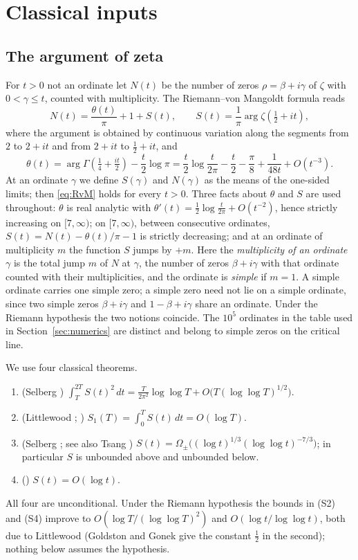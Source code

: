 \documentclass[11pt]{article}
\begin{document}
\section{Classical inputs}\label{sec:inputs}

\subsection{The argument of zeta}
For $t>0$ not an ordinate let $N(t)$ be the number of zeros $\rho=\beta+i\gamma$ of $\zeta$ with $0<\gamma\le t$, counted with multiplicity. The Riemann--von Mangoldt formula reads
\begin{equation}\label{eq:RvM}
N(t)=\frac{\theta(t)}{\pi}+1+S(t),\qquad S(t)=\frac1\pi\arg\zeta(\tfrac12+it),
\end{equation}
where the argument is obtained by continuous variation along the segments from $2$ to $2+it$ and from $2+it$ to $\frac12+it$, and
\[
\theta(t)=\arg\Gamma(\tfrac14+\tfrac{it}{2})-\frac t2\log\pi=\frac t2\log\frac{t}{2\pi}-\frac t2-\frac\pi8+\frac1{48t}+O(t^{-3}).
\]
At an ordinate $\gamma$ we define $S(\gamma)$ and $N(\gamma)$ as the means of the one-sided limits; then \eqref{eq:RvM} holds for every $t>0$. Three facts about $\theta$ and $S$ are used throughout: $\theta$ is real analytic with $\theta'(t)=\frac12\log\frac{t}{2\pi}+O(t^{-2})$, hence strictly increasing on $[7,\infty)$; on $[7,\infty)$, between consecutive ordinates, $S(t)=N(t)-\theta(t)/\pi-1$ is strictly decreasing; and at an ordinate of multiplicity $m$ the function $S$ jumps by $+m$. Here the \emph{multiplicity of an ordinate} $\gamma$ is the total jump $m$ of $N$ at $\gamma$, the number of zeros $\beta+i\gamma$ with that ordinate counted with their multiplicities, and the ordinate is \emph{simple} if $m=1$. A simple ordinate carries one simple zero; a simple zero need not lie on a simple ordinate, since two simple zeros $\beta+i\gamma$ and $1-\beta+i\gamma$ share an ordinate. Under the Riemann hypothesis the two notions coincide. The $10^5$ ordinates in the table used in Section~\ref{sec:numerics} are distinct and belong to simple zeros on the critical line.

We use four classical theorems.
\begin{enumerate}
\item[(S1)] (Selberg \cite{Selberg46}) $\displaystyle\int_T^{2T}S(t)^2\,dt=\frac{T}{2\pi^2}\log\log T+O\bigl(T(\log\log T)^{1/2}\bigr)$.
\item[(S2)] (Littlewood \cite{Littlewood24}; \cite[Theorem 9.9(A)]{Titchmarsh}) $S_1(T)=\int_0^T S(t)\,dt=O(\log T)$.
\item[(S3)] (Selberg \cite{Selberg46}; see also Tsang \cite{Tsang86}) $S(t)=\Omega_\pm\bigl((\log t)^{1/3}(\log\log t)^{-7/3}\bigr)$; in particular $S$ is unbounded above and unbounded below.
\item[(S4)] (\cite[Theorem 9.4]{Titchmarsh}) $S(t)=O(\log t)$.
\end{enumerate}
All four are unconditional. Under the Riemann hypothesis the bounds in (S2) and (S4) improve to $O(\log T/(\log\log T)^2)$ and $O(\log t/\log\log t)$, both due to Littlewood \cite{Littlewood24} (Goldston and Gonek \cite{GoldstonGonek} give the constant $\frac12$ in the second); nothing below assumes the hypothesis.
\end{document}
